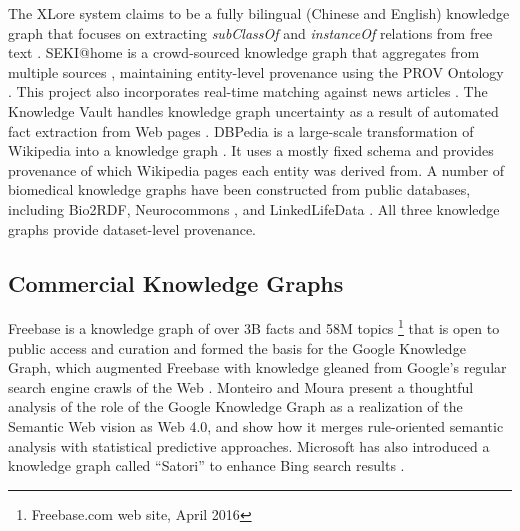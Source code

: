 The XLore system claims to be a fully bilingual (Chinese and English) knowledge graph that focuses on extracting \emph{subClassOf} and \emph{instanceOf} relations from free text \cite{wang2013xlore}.
SEKI@home is a crowd-sourced knowledge graph that aggregates from multiple sources \cite{steiner2012seki}, maintaining entity-level provenance using the PROV Ontology \cite{Moreau_2015}.
This project also incorporates real-time matching against news articles \cite{steiner_iswc_2012}.
The Knowledge Vault handles knowledge graph uncertainty as a result of automated fact extraction from Web pages \cite{Dong_2014}.
DBPedia is a large-scale transformation of Wikipedia into a knowledge graph \cite{Bizer_2009}.
It uses a mostly fixed schema and provides provenance of which Wikipedia pages each entity was derived from.
A number of biomedical knowledge graphs have been constructed from public databases, including Bio2RDF\cite{Callahan_2013}, Neurocommons \cite{Ruttenberg_2009}, and LinkedLifeData \cite{momtchev2009expanding}.
All three knowledge graphs provide dataset-level provenance.

\subsection{Commercial Knowledge Graphs}
Freebase is a knowledge graph of over 3B facts and 58M topics \footnote{Freebase.com web site, April 2016} that is open to public access and curation \cite{Bollacker_2008} and formed the basis for the Google Knowledge Graph, which augmented Freebase with knowledge gleaned from Google's regular search engine crawls of the Web \cite{singhal2012introducing}.
Monteiro and Moura \cite{10110943220141101} present a thoughtful analysis of the role of the Google Knowledge Graph as a realization of the Semantic Web vision \cite{bernerslee2000semantic} as Web 4.0, and show how it merges rule-oriented semantic analysis with statistical predictive approaches.
Microsoft has also introduced a knowledge graph called ``Satori'' to enhance Bing search results \cite{qian2013understand}.
